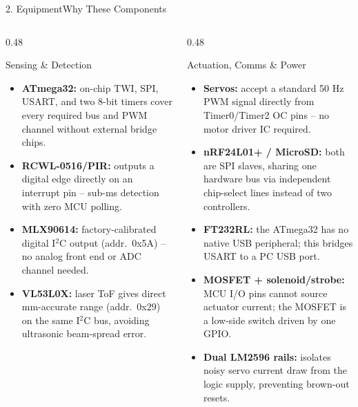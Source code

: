 \documentclass[aspectratio=169, 10pt]{beamer}
\begin{document}
\begin{frame}{2. Equipment}{Why These Components}
    \scriptsize
    \begin{columns}[T]
        \begin{column}{0.48\textwidth}
            \begin{block}{Sensing \& Detection}
                \begin{itemize}
                    \item \textbf{ATmega32:} on-chip TWI, SPI, USART, and two 8-bit timers cover every required bus and PWM channel without external bridge chips.
                    \item \textbf{RCWL-0516/PIR:} outputs a digital edge directly on an interrupt pin -- sub-ms detection with zero MCU polling.
                    \item \textbf{MLX90614:} factory-calibrated digital I$^2$C output (addr.\ 0x5A) -- no analog front end or ADC channel needed.
                    \item \textbf{VL53L0X:} laser ToF gives direct mm-accurate range (addr.\ 0x29) on the same I$^2$C bus, avoiding ultrasonic beam-spread error.
                \end{itemize}
            \end{block}
        \end{column}
        \begin{column}{0.48\textwidth}
            \begin{block}{Actuation, Comms \& Power}
                \begin{itemize}
                    \item \textbf{Servos:} accept a standard 50 Hz PWM signal directly from Timer0/Timer2 OC pins -- no motor driver IC required.
                    \item \textbf{nRF24L01+ / MicroSD:} both are SPI slaves, sharing one hardware bus via independent chip-select lines instead of two controllers.
                    \item \textbf{FT232RL:} the ATmega32 has no native USB peripheral; this bridges USART to a PC USB port.
                    \item \textbf{MOSFET + solenoid/strobe:} MCU I/O pins cannot source actuator current; the MOSFET is a low-side switch driven by one GPIO.
                    \item \textbf{Dual LM2596 rails:} isolates noisy servo current draw from the logic supply, preventing brown-out resets.
                \end{itemize}
            \end{block}
        \end{column}
    \end{columns}
\end{frame}
\end{document}
